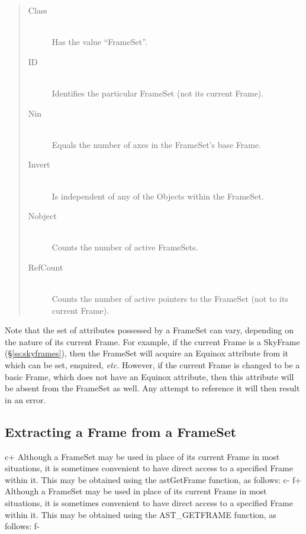 \documentclass[twoside,11pt]{article}
\newcommand{\secref}[1]{\S\ref{#1}}
\newcommand{\secref}[1]{\ref{#1}}
\begin{document}
\begin{quote}
\begin{description}
\item[Class]\mbox{}\\
Has the value ``FrameSet''.

\item[ID]\mbox{}\\
Identifies the particular FrameSet (not its current Frame).

\item[Nin]\mbox{}\\
Equals the number of axes in the FrameSet's base Frame.

\item[Invert]\mbox{}\\
Is independent of any of the Objects within the FrameSet.

\item[Nobject]\mbox{}\\
Counts the number of active FrameSets.

\item[RefCount]\mbox{}\\
Counts the number of active pointers to the FrameSet (not to its
current Frame).
\end{description}
\end{quote}

Note that the set of attributes possessed by a FrameSet can vary,
depending on the nature of its current Frame. For example, if the
current Frame is a SkyFrame (\secref{ss:skyframes}), then the FrameSet
will acquire an Equinox attribute from it which can be set, enquired,
{\em{etc.}}  However, if the current Frame is changed to be a basic
Frame, which does not have an Equinox attribute, then this attribute
will be absent from the FrameSet as well. Any attempt to reference it
will then result in an error.

\subsection{Extracting a Frame from a FrameSet}

c+
Although a FrameSet may be used in place of its current Frame in most
situations, it is sometimes convenient to have direct access to a
specified Frame within it. This may be obtained using the astGetFrame
function, as follows:
c-
f+
Although a FrameSet may be used in place of its current Frame in most
situations, it is sometimes convenient to have direct access to a
specified Frame within it. This may be obtained using the
AST\_GETFRAME function, as follows:
f-
\end{document}
